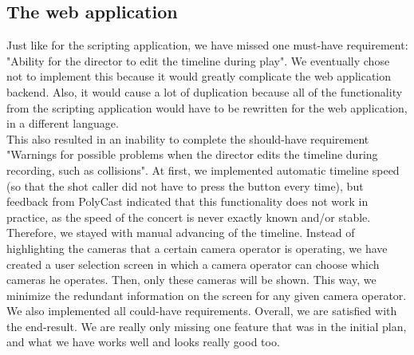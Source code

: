 \subsection{The web application}
Just like for the scripting application, we have missed one must-have requirement: "Ability for the director to edit the timeline during play". We eventually chose not to implement this because it would greatly complicate the web application backend. Also, it would cause a lot of duplication because all of the functionality from the scripting application would have to be rewritten for the web application, in a different language.\\
This also resulted in an inability to complete the should-have requirement "Warnings for possible problems when the director edits the timeline during recording, such as collisions". At first, we implemented automatic timeline speed (so that the shot caller did not have to press the button every time), but feedback from PolyCast indicated that this functionality does not work in practice, as the speed of the concert is never exactly known and/or stable. Therefore, we stayed with manual advancing of the timeline. Instead of highlighting the cameras that a certain camera operator is operating, we have created a user selection screen in which a camera operator can choose which cameras he operates. Then, only these cameras will be shown. This way, we minimize the redundant information on the screen for any given camera operator.\\
We also implemented all could-have requirements. Overall, we are satisfied with the end-result. We are really only missing one feature that was in the initial plan, and what we have works well and looks really good too.

